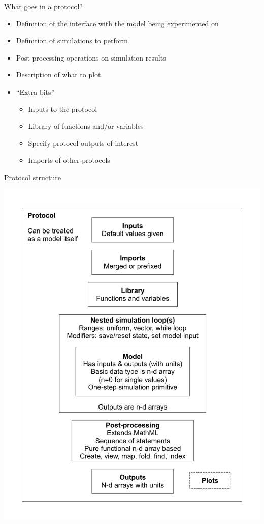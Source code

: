 \documentclass[t,xcolor={usenames,dvipsnames}]{beamer}
\begin{document}
\begin{frame}{What goes in a protocol?}
\begin{itemize}
\item Definition of the interface with the model being experimented on
\item Definition of simulations to perform
\item Post-processing operations on simulation results
\item Description of what to plot
\item ``Extra bits''
  \begin{itemize}
  \item Inputs to the protocol
  \item Library of functions and/or variables
  \item Specify protocol outputs of interest
  \item Imports of other protocols
  \end{itemize}
\end{itemize}
\end{frame}

\begin{frame}{Protocol structure}
\begin{center}
\vspace{-.5cm}
\includegraphics[height=.9\textheight]{proto_diag}
\end{center}
\end{frame}
\end{document}
